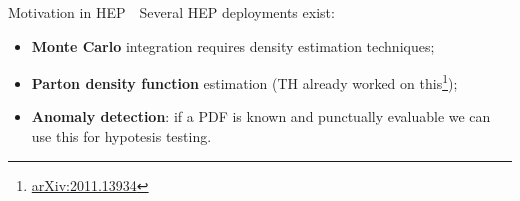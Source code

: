 \documentclass[8pt, xcolor={svgnames}, hyperref={colorlinks, linkcolor=black, citecolor=amethyst, urlcolor=amethyst}]{beamer}
\begin{document}
\begin{frame}{Motivation in HEP}
\large
\faArrowCircleRight\,\, Several HEP deployments exist:
\pause
  \begin{itemize}
  \item<2,3,4>[\faGear] \textbf{Monte Carlo} integration requires density estimation techniques;
  \item<3,4>[\faGear] \textbf{Parton density function} estimation (TH already worked on 
        this\footnote<3->{\href{https://arxiv.org/abs/2011.13934}{arXiv:2011.13934}});
  \item<4>[\faGear] \textbf{Anomaly detection}: if a PDF is known and punctually evaluable
        we can use this for hypotesis testing.
  \end{itemize}
  \begin{multicols}{3}
    \begin{figure}
    \end{figure}
    \begin{figure}
    \end{figure}
    \begin{figure}
    \end{figure}
\end{multicols}
\end{frame}
\end{document}
